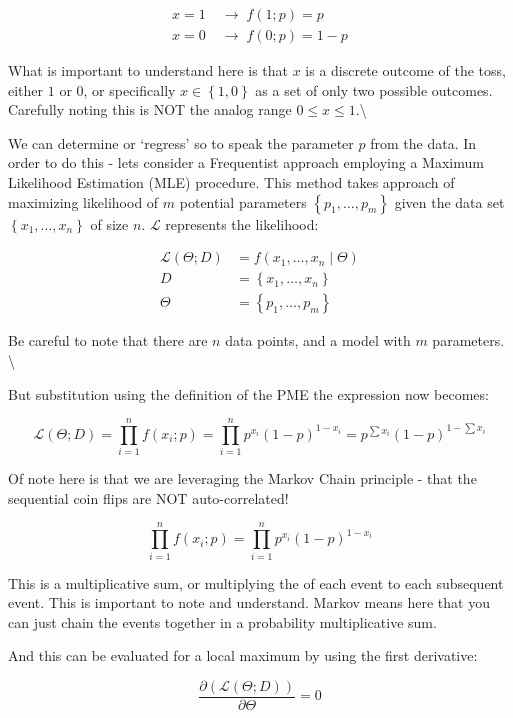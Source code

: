 \documentclass[
  12 pt,
  a4paper,
]{book}
\numberwithin{equation}{section}
\theoremstyle{plain}      %
\theoremstyle{definition} %
\theoremstyle{remark}     %
\theoremstyle{note}         %
\begin{document}
\begin{align}
x=1 \; & \rightarrow \; f(1; p) = p\\
x=0 \; & \rightarrow \; f(0; p) = 1-p 
\end{align}

What is important to understand here is that \(x\) is a discrete outcome
of the toss, either \(1\) or \(0\), or specifically
\(x \in \left\{1, 0\right\}\) as a set of only two possible outcomes.
Carefully noting this is NOT the analog range
\(0 \leq x \leq 1\).\textbackslash{}

We can determine or `regress' so to speak the parameter \(p\) from the
data. In order to do this - lets consider a Frequentist approach
employing a Maximum Likelihood Estimation (MLE) procedure. This method
takes approach of maximizing likelihood of \(m\) potential parameters
\(\left\{p_{1}, \ldots, p_{m}\right\}\) given the data set
\(\left\{x_{1}, \ldots, x_{n}\right\}\) of size \(n\). \(\mathcal{L}\)
represents the likelihood:

\begin{align}
\mathcal{L}(\Theta ; D) & =f\left(x_{1}, \ldots, x_{n} \mid \Theta\right)\\
D & =\left\{x_{1}, \ldots, x_{n}\right\}\\
\Theta & =\left\{p_{1}, \ldots, p_{m}\right\}
\end{align}

Be careful to note that there are \(n\) data points, and a model with
\(m\) parameters. \textbackslash{}

But substitution using the definition of the PME the expression now
becomes:

\[
\mathcal{L}(\Theta ; D)=\prod_{i=1}^{n} f\left(x_{i} ; p\right)=\prod_{i=1}^{n} p^{x_{i}}(1-p)^{1-x_{i}}=p^{\sum x_{i}}(1-p)^{1-\sum x_{i}}
\]

Of note here is that we are leveraging the Markov Chain principle - that
the sequential coin flips are NOT auto-correlated!

\[
\prod_{i=1}^{n} f\left(x_{i} ; p\right)=\prod_{i=1}^{n} p^{x_{i}}(1-p)^{1-x_{i}}
\]

This is a multiplicative sum, or multiplying the of each event to each
subsequent event. This is important to note and understand. Markov means
here that you can just chain the events together in a probability
multiplicative sum.

And this can be evaluated for a local maximum by using the first
derivative:

\[
\frac{\partial (\mathcal{L}(\Theta ; D))}{\partial \Theta}=0
\]
\end{document}
